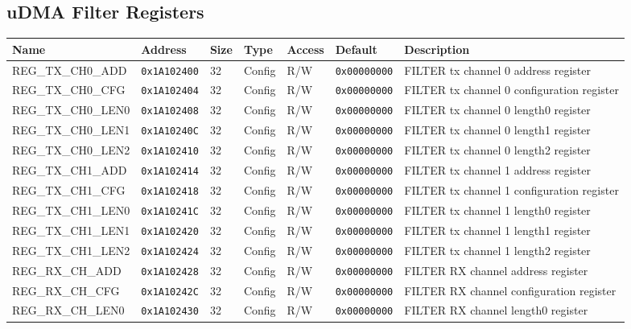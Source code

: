 
\subsection{uDMA Filter Registers}
{\small
\begin{tabularx}{\textwidth}{|l|l|l|l|l|l|X|}
  \hline
  \textbf{Name} & \textbf{Address}  & \textbf{Size} & \textbf{Type} & \textbf{Access} & \textbf{Default} & \textbf{Description} \\
  \hline
  REG\_TX\_CH0\_ADD & \texttt{0x1A102400} & 32 & Config & R/W & \texttt{0x00000000} & FILTER tx channel 0 address register\\
  \hline
  REG\_TX\_CH0\_CFG & \texttt{0x1A102404} & 32 & Config & R/W & \texttt{0x00000000} & FILTER tx channel 0 configuration register\\
  \hline
  REG\_TX\_CH0\_LEN0 & \texttt{0x1A102408} & 32 & Config & R/W & \texttt{0x00000000} & FILTER tx channel 0 length0 register\\
  \hline
  REG\_TX\_CH0\_LEN1 & \texttt{0x1A10240C} & 32 & Config & R/W & \texttt{0x00000000} & FILTER tx channel 0 length1 register\\
  \hline
  REG\_TX\_CH0\_LEN2 & \texttt{0x1A102410} & 32 & Config & R/W & \texttt{0x00000000} & FILTER tx channel 0 length2 register\\
  \hline
  REG\_TX\_CH1\_ADD & \texttt{0x1A102414} & 32 & Config & R/W & \texttt{0x00000000} & FILTER tx channel 1 address register\\
  \hline
  REG\_TX\_CH1\_CFG & \texttt{0x1A102418} & 32 & Config & R/W & \texttt{0x00000000} & FILTER tx channel 1 configuration register\\
  \hline
  REG\_TX\_CH1\_LEN0 & \texttt{0x1A10241C} & 32 & Config & R/W & \texttt{0x00000000} & FILTER tx channel 1 length0 register\\
  \hline
  REG\_TX\_CH1\_LEN1 & \texttt{0x1A102420} & 32 & Config & R/W & \texttt{0x00000000} & FILTER tx channel 1 length1 register\\
  \hline
  REG\_TX\_CH1\_LEN2 & \texttt{0x1A102424} & 32 & Config & R/W & \texttt{0x00000000} & FILTER tx channel 1 length2 register\\
  \hline
  REG\_RX\_CH\_ADD & \texttt{0x1A102428} & 32 & Config & R/W & \texttt{0x00000000} & FILTER RX channel address register\\
  \hline
  REG\_RX\_CH\_CFG & \texttt{0x1A10242C} & 32 & Config & R/W & \texttt{0x00000000} & FILTER RX channel configuration register\\
  \hline
  REG\_RX\_CH\_LEN0 & \texttt{0x1A102430} & 32 & Config & R/W & \texttt{0x00000000} & FILTER RX channel length0 register\\

\end{tabularx}}
